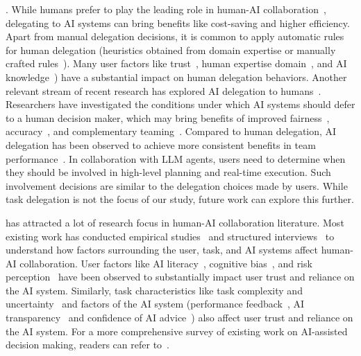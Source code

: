 . While humans prefer to play the leading role in human-AI collaboration~\cite{lubars2019ask}, delegating to AI systems can bring benefits like cost-saving and higher efficiency. 
Apart from manual delegation decisions, it is common to apply automatic rules for human delegation (\eg heuristics obtained from domain expertise or manually crafted rules~\cite{lai2022human}).
Many user factors like trust~\cite{lubars2019ask}, human expertise domain~\cite{erlei2024understanding}, and AI knowledge~\cite{pinski2023ai}) have a substantial impact on human delegation behaviors. 
Another relevant stream of recent research has explored AI delegation to humans~\cite{madras2018predict,fugener2022cognitive,pinski2023ai}. 
Researchers have investigated the conditions under which AI systems should defer to a human decision maker, which may bring benefits of improved fairness~\cite{madras2018predict}, accuracy~\cite{narasimhan2022post}, and complementary teaming~\cite{ijcai2022p344}. 
Compared to human delegation, AI delegation has been observed to achieve more consistent benefits in team performance~\cite{fugener2022cognitive,hemmer2023human}. {In collaboration with LLM agents, users need to determine when they should be involved in high-level planning and real-time execution. Such involvement decisions are similar to the delegation choices made by users. While task delegation is not the focus of our study, future work can explore this further.}%


 has attracted a lot of research focus in human-AI collaboration literature. 
Most existing work has conducted empirical studies~\cite{lai2021towards} and structured interviews~\cite{jiang2021supporting} to understand how factors surrounding the user, task, and AI systems affect human-AI collaboration. 
User factors like AI literacy~\cite{Chiang-IUI-2022}, cognitive bias~\cite{rastogi2022deciding}, and risk perception~\cite{fogliato2021impact,green2021algorithmic} have been observed to substantially impact user trust and reliance on the AI system. 
Similarly, task characteristics like task complexity and uncertainty~\cite{salimzadeh2023missing,salimzadeh2024dealing} and factors of the AI system (\eg performance feedback~\cite{bansal2019beyond,Lu-CHI-2021}, AI transparency~\cite{vossing2022designing} and confidence of AI advice~\cite{tomsett2020rapid,Zhang-FAT-2020}) also affect user trust and reliance on the AI system. 
For a more comprehensive survey of existing work on AI-assisted decision making, readers can refer to~\cite{lai2021towards}.

